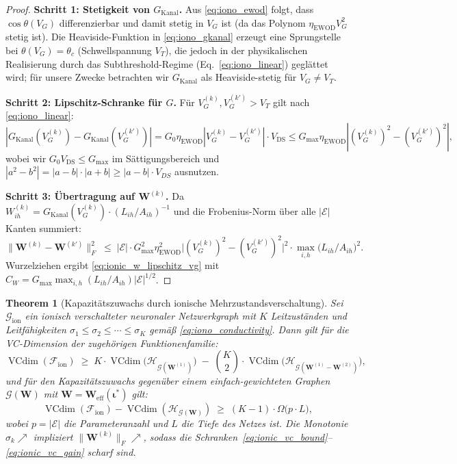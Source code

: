 ﻿\documentclass[12pt, a4paper, openany]{report}
\newtheorem{theorem}{Theorem}[chapter]
\newcommand{\calG}{\mathcal{G}}
\newcommand{\calH}{\mathcal{H}}
\newcommand{\calE}{\mathcal{E}}
\newcommand{\calF}{\mathcal{F}}
\DeclareMathOperator{\VC}{VCdim}
\begin{document}
\begin{proof}
\textbf{Schritt 1: Stetigkeit von $G_{\mathrm{Kanal}}$.}
Aus \eqref{eq:iono_ewod} folgt, dass $\cos\theta(V_G)$ differenzierbar
und damit stetig in $V_G$ ist (da das Polynom $\eta_{\mathrm{EWOD}} V_G^2$
stetig ist).  Die Heaviside-Funktion in \eqref{eq:iono_gkanal} erzeugt
eine Sprungstelle bei $\theta(V_G) = \theta_c$ (Schwellspannung $V_T$),
die jedoch in der physikalischen Realisierung durch das Subthreshold-Regime
(Eq.~\ref{eq:iono_linear}) geglättet wird; für unsere Zwecke betrachten
wir $G_{\mathrm{Kanal}}$ als Heaviside-stetig für $V_G \neq V_T$.

\textbf{Schritt 2: Lipschitz-Schranke für $G$.}
Für $V_G^{(k)}, V_G^{(k')} > V_T$ gilt nach \eqref{eq:iono_linear}:
\[
  |G_{\mathrm{Kanal}}(V_G^{(k)}) - G_{\mathrm{Kanal}}(V_G^{(k')})| 
  = G_0 \eta_{\mathrm{EWOD}} |V_G^{(k)} - V_G^{(k')}| \cdot V_\mathrm{DS}
  \leq G_{\max} \eta_{\mathrm{EWOD}} |(V_G^{(k)})^2 - (V_G^{(k')})^2|,
\]
wobei wir $G_0 V_\mathrm{DS} \leq G_{\max}$ im Sättigungsbereich
und $|a^2 - b^2| = |a-b| \cdot |a+b| \geq |a-b| \cdot V_{DS}$ ausnutzen.

\textbf{Schritt 3: Übertragung auf $\bm{W}^{(k)}$.}
Da $W^{(k)}_{ih} = G_{\mathrm{Kanal}}(V_G^{(k)}) \cdot (L_{ih}/A_{ih})^{-1}$
und die Frobenius-Norm über alle $|\calE|$ Kanten summiert:
\[
  \|\bm{W}^{(k)} - \bm{W}^{(k')}\|_F^2
  \;\leq\;
  |\calE| \cdot G_{\max}^2 \eta_{\mathrm{EWOD}}^2
  \bigl|(V_G^{(k)})^2 - (V_G^{(k')})^2\bigr|^2
  \cdot \max_{i,h}\bigl(L_{ih}/A_{ih}\bigr)^2.
\]
Wurzelziehen ergibt \eqref{eq:ionic_w_lipschitz_vg} mit
$C_W = G_{\max} \max_{i,h}(L_{ih}/A_{ih}) |\calE|^{1/2}$.
\end{proof}

\begin{theorem}[Kapazitätszuwachs durch ionische Mehrzustandsverschaltung]
\label{thm:ionic_capacity}
Sei $\calG_{\mathrm{ion}}$ ein ionisch verschalteter neuronaler Netzwerkgraph
mit $K$ Leitzuständen und Leitfähigkeiten $\sigma_1 \leq \sigma_2 \leq
\cdots \leq \sigma_K$ gemäß \eqref{eq:iono_conductivity}.
Dann gilt für die VC-Dimension der zugehörigen Funktionenfamilie:
\begin{equation}
  \label{eq:ionic_vc_bound}
  \VC(\calF_{\mathrm{ion}})
  \;\geq\;
  K \cdot \VC\!\bigl(\calH_{\calG(\bm{W}^{(1)})}\bigr)
  \;-\;
  \binom{K}{2} \cdot \VC\!\bigl(\calH_{\calG(\bm{W}^{(1)}\!-\!\bm{W}^{(2)})}\bigr),
\end{equation}
und für den Kapazitätszuwachs gegenüber einem einfach-gewichteten Graphen
$\calG(\bm{W})$ mit $\bm{W} = \bm{W}_{\mathrm{eff}}(\bm{\iota}^*)$ gilt:
\begin{equation}
  \label{eq:ionic_vc_gain}
  \VC(\calF_{\mathrm{ion}}) - \VC(\calH_{\calG(\bm{W})})
  \;\geq\;
  (K-1) \cdot \Omega\!\bigl(p \cdot L\bigr),
\end{equation}
wobei $p = |\calE|$ die Parameteranzahl und $L$ die Tiefe des Netzes ist.
Die Monotonie $\sigma_k \nearrow$ impliziert $\|\bm{W}^{(k)}\|_F \nearrow$,
sodass die Schranken~\eqref{eq:ionic_vc_bound}--\eqref{eq:ionic_vc_gain} scharf sind.
\end{theorem}
\end{document}
